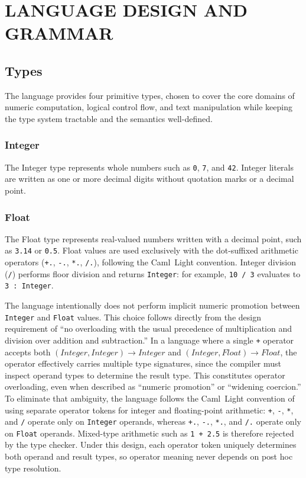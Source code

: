 \chapter{LANGUAGE DESIGN AND GRAMMAR}

\section{Types}
The language provides four primitive types, chosen to cover the core domains
of numeric computation, logical control flow, and text manipulation while
keeping the type system tractable and the semantics well-defined.

\subsection{Integer}
The Integer type represents whole numbers such as \texttt{0}, \texttt{7}, and
\texttt{42}. Integer literals are written as one or more decimal digits without
quotation marks or a decimal point.

\subsection{Float}
The Float type represents real-valued numbers written with a decimal point, such
as \texttt{3.14} or \texttt{0.5}. Float values are used exclusively with the
dot-suffixed arithmetic operators (\texttt{+.}, \texttt{-.}, \texttt{*.},
\texttt{/.}), following the Caml~Light convention. Integer division (\texttt{/})
performs floor division and returns \texttt{Integer}: for example,
\texttt{10 / 3} evaluates to \texttt{3 : Integer}.

The language intentionally does not perform implicit numeric promotion between
\texttt{Integer} and \texttt{Float} values. This choice follows directly from
the design requirement of ``no overloading with the usual precedence of
multiplication and division over addition and subtraction.'' In a language
where a single \texttt{+} operator accepts both
$(\textit{Integer}, \textit{Integer}) \rightarrow \textit{Integer}$ and
$(\textit{Integer}, \textit{Float}) \rightarrow \textit{Float}$, the operator
effectively carries multiple type signatures, since the compiler must inspect
operand types to determine the result type. This constitutes operator
overloading, even when described as ``numeric promotion'' or ``widening
coercion.'' To eliminate that ambiguity, the language follows the Caml~Light
convention of using separate operator tokens for integer and floating-point
arithmetic: \texttt{+}, \texttt{-}, \texttt{*}, and \texttt{/} operate only on
\texttt{Integer} operands, whereas \texttt{+.}, \texttt{-.}, \texttt{*.}, and
\texttt{/.} operate only on \texttt{Float} operands. Mixed-type arithmetic such
as \texttt{1 + 2.5} is therefore rejected by the type checker. Under this
design, each operator token uniquely determines both operand and result types,
so operator meaning never depends on post hoc type resolution.

